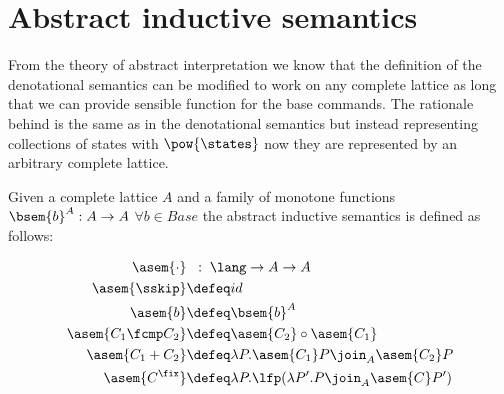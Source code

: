 \section{Abstract inductive semantics}

From the theory of abstract interpretation we know that the definition of the
denotational semantics can be modified to work on any complete lattice as long
that we can provide sensible function for the base commands. The rationale
behind is the same as in the denotational semantics but instead representing
collections of states with $\pow{\states}$ now they are represented by an
arbitrary complete lattice.

\begin{definition}
  Given a complete lattice $A$ and a family of monotone functions $\bsem{b}^A : A
  \to A$ $\forall b \in Base$ the abstract inductive semantics is defined as 
  follows:

  \begin{align*}
      \asem{\cdot}         & \;\;:\; \lang \to A \to A \\
      \asem{\sskip}         &\defeq id \\
      \asem{b}             &\defeq \bsem{b}^A \\
      \asem{C_1 \fcmp C_2} &\defeq \asem{C_2} \circ \asem{C_1} \\
      \asem{C_1 + C_2}     &\defeq \lambda P . \asem{C_1} P \join_A \asem{C_2} P \\
      \asem{C^\fix}        &\defeq \lambda P . \lfp(\lambda P'. P \join_A \asem{C} P')
  \end{align*}
\end{definition}

